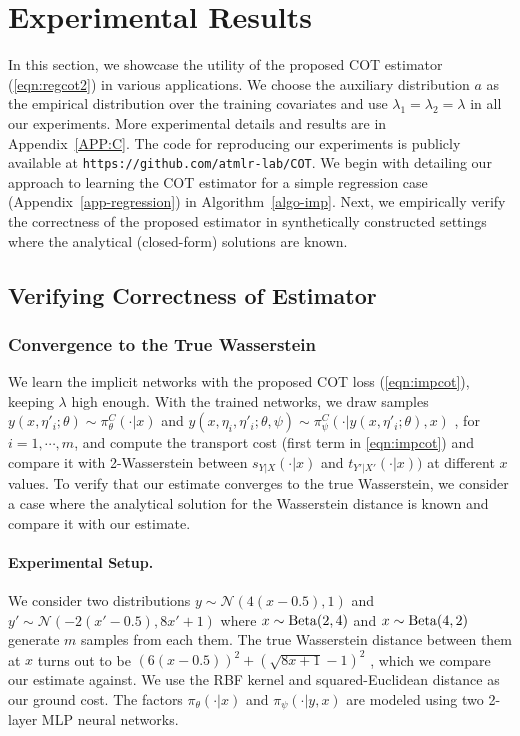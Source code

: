 \section{Experimental Results}\label{sec:exp}
In this section, we showcase the utility of the proposed COT estimator (\ref{eqn:regcot2}) in various applications.
We choose the auxiliary distribution $a$ as the empirical distribution over the training covariates and use $\lambda_1=\lambda_2=\lambda$ in all our experiments. More experimental details and results are in Appendix~\ref{APP:C}. The code for reproducing our experiments is publicly available at \texttt{https://github.com/atmlr-lab/COT}.
\newline
We begin with detailing our approach to learning the COT estimator for a simple regression case (Appendix~\ref{app-regression}) in Algorithm~\ref{algo-imp}. Next, we empirically verify the correctness of the proposed estimator in synthetically constructed settings where the analytical (closed-form) solutions are known.
\subsection{Verifying Correctness of Estimator}
\subsubsection{Convergence to the True Wasserstein}\label{trueWass}
We learn the implicit networks with the proposed COT loss (\ref{eqn:impcot}), keeping $\lambda$ high enough. With the trained networks, we draw samples $y(x, \eta'_i; \theta)\sim \pi^C_\theta(\cdot|x)$ and $y(x, \eta_i, \eta'_i; \theta, \psi)\sim \pi^C_\psi(\cdot|y(x, \eta'_i; \theta), x)$ , for $i=1,\cdots, m$, and compute the transport cost (first term in \ref{eqn:impcot}) and compare it with 2-Wasserstein between $s_{Y|X}(\cdot|x)$ and $t_{Y'|X'}(\cdot|x))$ at different $x$ values. To verify that our estimate converges to the true Wasserstein, we consider a case where the analytical solution for the Wasserstein distance is known and compare it with our estimate.
\paragraph{Experimental Setup.} We consider two distributions $y \sim \mathcal{N}(4(x-0.5),1)$ and $y' \sim \mathcal{N}(-2(x'-0.5),8x'+1)$ where $x \sim \rm{Beta}(2,4)$ and $x \sim \rm{Beta}(4,2)$ generate $m$ samples from each them. The true Wasserstein distance between them at $x$ turns out to be $(6(x-0.5))^2 + (\sqrt{8x+1}-1)^2$ \cite[Eq. (2.39)]{peyre2019computational}, which we compare our estimate against. We use the RBF kernel and squared-Euclidean distance as our ground cost. The factors $\pi_\theta(\cdot|x)$ and $\pi_\psi(\cdot|y,x)$ are modeled using two 2-layer MLP neural networks.

